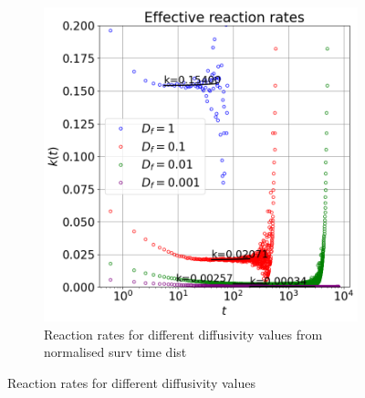 \documentclass{article}
\begin{document}
\begin{figure}[htbp]
\begin{subfigure}[b]{0.45\textwidth}
        \includegraphics[width=\textwidth]{images/compareDiffNormAdsRates.png}
        \caption{Reaction rates for different diffusivity values from normalised surv time dist}
    \end{subfigure}
    \caption{Reaction rates for different diffusivity values}
    \label{fig:reactionRatesDiff}
\end{figure}

\FloatBarrier  %
\end{document}
